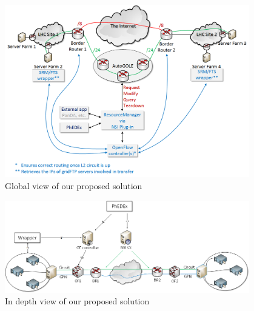 \begin{figure}[h]
  \centering
  \includegraphics[width=0.95\textwidth]{Figures/Proposed_solution-global_view.png}
  \caption{Global view of our proposed solution}
  \label{fig:global-solution-view}
\end{figure} 

\begin{figure}[h]
  \centering
  \includegraphics[width=0.95\textwidth]{Figures/Proposed_solution-zoom_view.png}
  \caption{In depth view of our proposed solution}
  \label{fig:zoom-solution-view}
\end{figure} 

